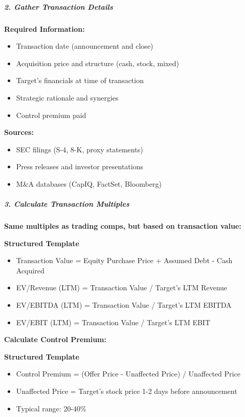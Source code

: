 \documentclass[11pt]{article}
\begin{document}
\subparagraph{2. Gather Transaction Details}\mbox{}\par

\textbf{Required Information:}

\begin{itemize}[leftmargin=*,itemsep=2pt,topsep=2pt]
\item {} Transaction date (announcement and close)
\item {} Acquisition price and structure (cash, stock, mixed)
\item {} Target's financials at time of transaction
\item {} Strategic rationale and synergies
\item {} Control premium paid
\end{itemize}

\textbf{Sources:}

\begin{itemize}[leftmargin=*,itemsep=2pt,topsep=2pt]
\item {} SEC filings (S-4, 8-K, proxy statements)
\item {} Press releases and investor presentations
\item {} M\&A databases (CapIQ, FactSet, Bloomberg)
\end{itemize}

\subparagraph{3. Calculate Transaction Multiples}\mbox{}\par

\textbf{Same multiples as trading comps, but based on transaction value:}


\textbf{Structured Template}
\begin{itemize}[leftmargin=*,itemsep=2pt,topsep=2pt]
\item {} Transaction Value = Equity Purchase Price + Assumed Debt - Cash Acquired
\item {} EV/Revenue (LTM) = Transaction Value / Target's LTM Revenue
\item {} EV/EBITDA (LTM) = Transaction Value / Target's LTM EBITDA
\item {} EV/EBIT (LTM) = Transaction Value / Target's LTM EBIT
\end{itemize}

\textbf{Calculate Control Premium:}

\textbf{Structured Template}
\begin{itemize}[leftmargin=*,itemsep=2pt,topsep=2pt]
\item {} Control Premium = (Offer Price - Unaffected Price) / Unaffected Price
\end{itemize}
\begin{itemize}[leftmargin=*,itemsep=2pt,topsep=2pt]
\item {} Unaffected Price = Target's stock price 1-2 days before announcement
\item {} Typical range: 20-40\%
\end{itemize}
\end{document}
